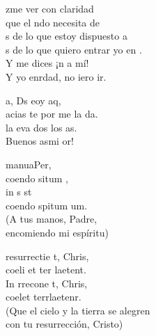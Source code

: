 \documentclass[12pt]{article}
\begin{document}
\begin{multicols*}{2}
\begin{cancion}%
	zme ver con claridad\\
	que el ndo necesita de \\
	s de lo que estoy dispuesto a  \\
	s de lo que quiero entrar yo en . \\
	Y  me dices ¡n a mí!  \\
	Y yo enrdad, no iero ir.\\
\end{cancion}%

\begin{cancion}%
	a, Ds eoy aq,\\
	acias te  por me la da.\\
	la eva dos los as.\\
	Buenos asmi or! \\
\end{cancion}%

\begin{cancion}%
	 manuaPer,\\
	coendo situm ,\\
	in s st \\
	coendo spitum um.\\
(A tus manos, Padre, \\
 encomiendo mi espíritu)\\
\end{cancion}%

\begin{cancion}%
	 resurrectie t, Chris,\\
	coeli et ter laetent.\\
	In rrecone t, Chris,\\
	coelet terrlaetenr.\\
(Que el cielo y la tierra se alegren\\
 con tu resurrección, Cristo)\\
\end{cancion}%


\end{multicols*}
\end{document}
